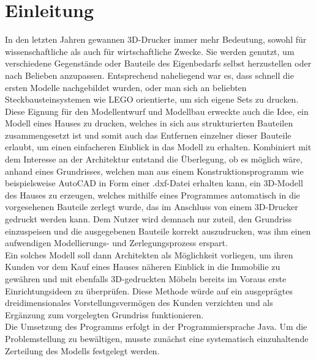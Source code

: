 \chapter{Einleitung}
\setcounter{page}{1}
In den letzten Jahren gewannen 3D-Drucker immer mehr Bedeutung, sowohl für wissenschaftliche als auch für wirtschaftliche Zwecke. 
Sie werden genutzt, um verschiedene Gegenstände oder Bauteile des Eigenbedarfs selbst herzustellen oder nach Belieben anzupassen. 
Entsprechend naheliegend war es, dass schnell die ersten Modelle nachgebildet wurden, oder man sich an beliebten Steckbausteinsystemen wie LEGO orientierte, um sich eigene Sets zu drucken. \\
Diese Eignung für den Modellentwurf und Modellbau erweckte auch die Idee, ein Modell eines Hauses zu drucken, welches in sich aus strukturierten Bauteilen zusammengesetzt ist und somit auch das Entfernen einzelner dieser Bauteile erlaubt, um einen einfacheren Einblick in das Modell zu erhalten. 
Kombiniert mit dem Interesse an der Architektur entstand die Überlegung, ob es möglich wäre, anhand eines Grundrisses, welchen man aus einem Konstruktionsprogramm wie beispielsweise AutoCAD in Form einer .dxf-Datei erhalten kann, ein 3D-Modell des Hauses zu erzeugen, welches mithilfe eines Programmes automatisch in die vorgesehenen Bauteile zerlegt wurde, das im Anschluss von einem 3D-Drucker gedruckt werden kann.
 Dem Nutzer wird demnach nur zuteil, den Grundriss einzuspeisen und die ausgegebenen Bauteile korrekt auszudrucken,  was ihm einen aufwendigen Modellierungs- und Zerlegungsprozess erspart. \\
Ein solches Modell soll dann Architekten als Möglichkeit vorliegen, um ihren Kunden vor dem Kauf eines Hauses näheren Einblick in die Immobilie zu gewähren und mit ebenfalls 3D-gedruckten Möbeln bereits im Voraus erste Einrichtungsideen zu überprüfen. 
Diese Methode würde auf ein ausgeprägtes dreidimensionales Vorstellungsvermögen des Kunden verzichten und als Ergänzung zum vorgelegten Grundriss funktionieren.\\
Die Umsetzung des Programms erfolgt in der Programmiersprache Java.
Um die Problemstellung zu bewältigen, musste zunächst eine systematisch einzuhaltende Zerteilung des Modells festgelegt werden. 

